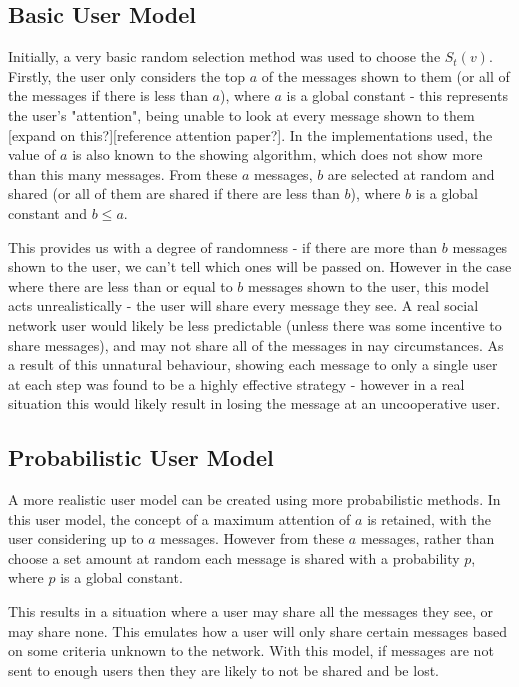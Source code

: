 \documentclass[bsc,frontabs,twoside,singlespacing,parskip,deptreport]{infthesis}     %
\begin{document}
\subsection{Basic User Model}
Initially, a very basic random selection method was used to choose the $S_{t}(v)$. Firstly, the user only considers the top $a$ of the messages shown to them (or all of the messages if there is less than $a$), where $a$ is a global constant - this represents the user's "attention", being unable to look at every message shown to them [expand on this?][reference attention paper?]. In the implementations used, the value of $a$ is also known to the showing algorithm, which does not show more than this many messages. From these $a$ messages, $b$ are selected at random and shared (or all of them are shared if there are less than $b$), where $b$ is a global constant and $b \le a$.

This provides us with a degree of randomness - if there are more than $b$ messages shown to the user, we can't tell which ones will be passed on. However in the case where there are less than or equal to $b$ messages shown to the user, this model acts unrealistically - the user will share every message they see. A real social network user would likely be less predictable (unless there was some incentive to share messages), and may not share all of the messages in nay circumstances. As a result of this unnatural behaviour, showing each message to only a single user at each step was found to be a highly effective strategy - however in a real situation this would likely result in losing the message at an uncooperative user.

\subsection{Probabilistic User Model}
A more realistic user model can be created using more probabilistic methods. In this user model, the concept of a maximum attention of $a$ is retained, with the user considering up to $a$ messages. However from these $a$ messages, rather than choose a set amount at random each message is shared with a probability $p$, where $p$ is a global constant.

This results in a situation where a user may share all the messages they see, or may share none. This emulates how a user will only share certain messages based on some criteria unknown to the network. With this model, if messages are not sent to enough users then they are likely to not be shared and be lost.
\end{document}
